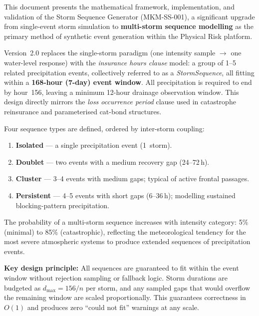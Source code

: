 \documentclass[11pt,a4paper]{article}
\begin{document}
\mkmtitlepage
\mkmlegalpage
\tableofcontents
\clearpage

\mkmexecsummary

This document presents the mathematical framework, implementation, and validation of the
Storm Sequence Generator (MKM-SS-001), a significant upgrade from single-event storm
simulation to \textbf{multi-storm sequence modelling} as the primary method of synthetic
event generation within the Physical Risk platform.

Version~2.0 replaces the single-storm paradigm (one intensity sample $\to$ one
water-level response) with the \emph{insurance hours clause} model: a group of 1--5
related precipitation events, collectively referred to as a \emph{StormSequence}, all
fitting within a \textbf{168-hour (7-day) event window}. All precipitation is required
to end by hour~156, leaving a minimum 12-hour drainage observation window. This design
directly mirrors the \emph{loss occurrence period} clause used in catastrophe reinsurance
and parameterised cat-bond structures.

Four sequence types are defined, ordered by inter-storm coupling:
\begin{enumerate}[nosep]
  \item \textbf{Isolated} --- a single precipitation event (1~storm).
  \item \textbf{Doublet} --- two events with a medium recovery gap (24--72\,h).
  \item \textbf{Cluster} --- 3--4 events with medium gaps; typical of active frontal passages.
  \item \textbf{Persistent} --- 4--5 events with short gaps (6--36\,h); modelling sustained
        blocking-pattern precipitation.
\end{enumerate}

\noindent The probability of a multi-storm sequence increases with intensity category:
5\% (minimal) to 85\% (catastrophic), reflecting the meteorological tendency for the most
severe atmospheric systems to produce extended sequences of precipitation events.

\textbf{Key design principle:} All sequences are guaranteed to fit within the event window
without rejection sampling or fallback logic. Storm durations are budgeted as
$d_{\max} = 156 / n$ per storm, and any sampled gaps that would overflow the remaining
window are scaled proportionally. This guarantees correctness in $O(1)$ and produces
zero ``could not fit'' warnings at any scale.
\end{document}
